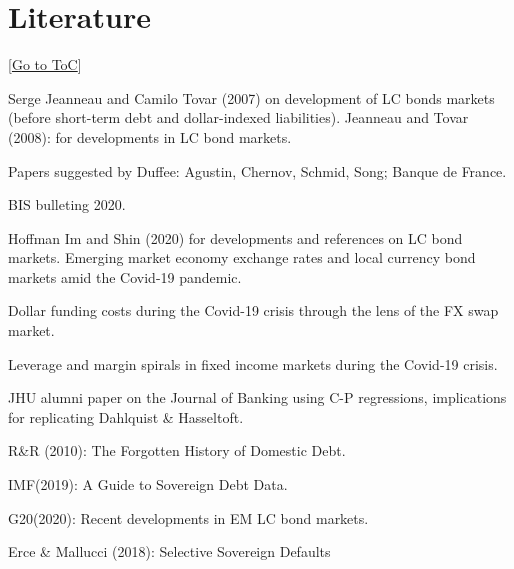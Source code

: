 \documentclass[12pt]{article}
\newcommand{\gototoc}{\vspace{-1.8cm} \null\hfill [\hyperlink{toc}{Go to ToC}] \newline}
\begin{document}
\section{Literature}
\gototoc
\begin{todolist}
	\item Serge Jeanneau and Camilo Tovar (2007) on development of LC bonds markets (before short-term debt and dollar-indexed liabilities). Jeanneau and Tovar (2008): for developments in LC bond markets.
	\item Papers suggested by Duffee: Agustin, Chernov, Schmid, Song; Banque de France.
	\item BIS bulleting 2020.
	\begin{todolist}
		\item Hoffman Im and Shin (2020) for developments and references on LC bond markets. Emerging market economy exchange rates and local currency bond markets amid the Covid-19 pandemic.
		\item Dollar funding costs during the Covid-19 crisis through the lens of the FX swap market.
		\item Leverage and margin spirals in fixed income markets during the Covid-19 crisis.
	\end{todolist}
	
	\item JHU alumni paper on the Journal of Banking using C-P regressions, implications for replicating Dahlquist \& Hasseltoft.
	\item R\&R (2010): The Forgotten History of Domestic Debt.
	\item IMF(2019): A Guide to Sovereign Debt Data.
	\item G20(2020): Recent developments in EM LC bond markets.
	\item Erce \& Mallucci (2018): Selective Sovereign Defaults
\end{todolist}
\end{document}
